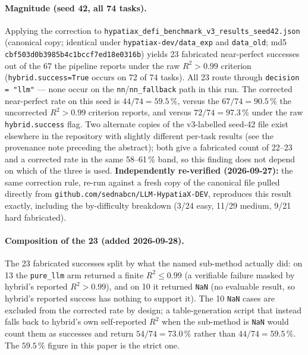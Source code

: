 \documentclass[twoside,11pt]{article}
\newcommand{\Rsq}{R^{2}}
\begin{document}
\paragraph{Magnitude (seed 42, all 74 tasks).}
Applying the correction to
\texttt{hypatiax\_defi\_benchmark\_v3\_results\_seed42.json}
(canonical copy; identical under \texttt{hypatiax-dev/data\_exp} and \texttt{data\_old}; md5 \texttt{cbf503d0b3985b4c1bccf7ed18e0316b}) yields
23 fabricated near-perfect successes out of the 67 the pipeline reports
under the raw $\Rsq>0.99$ criterion (\texttt{hybrid.success=True} occurs
on 72 of 74 tasks). All 23 route through
\texttt{decision = "llm"} --- none occur on the
\texttt{nn}/\texttt{nn\_fallback} path in this run. The corrected
near-perfect rate on this seed is $44/74 = 59.5\,\%$, versus the
$67/74 = 90.5\,\%$ the uncorrected $\Rsq>0.99$ criterion reports, and
versus $72/74=97.3\,\%$ under the raw \texttt{hybrid.success} flag. Two
alternate copies of the v3-labelled seed-42 file exist elsewhere in the
repository with slightly different per-task results (see the provenance
note preceding the abstract); both give a fabricated count of 22--23 and
a corrected rate in the same 58--61\,\% band, so this finding does not
depend on which of the three is used. \textbf{Independently re-verified
(2026-09-27):} the same correction rule, re-run against a fresh copy of
the canonical file pulled directly from
\texttt{github.com/sednabcn/LLM-HypatiaX-DEV}, reproduces this result
exactly, including the by-difficulty breakdown (3/24 easy, 11/29 medium,
9/21 hard fabricated).

\paragraph{Composition of the 23 (added 2026-09-28).} The 23 fabricated
successes split by what the named sub-method actually did: on 13 the
\texttt{pure\_llm} arm returned a finite $\Rsq\le0.99$ (a verifiable
failure masked by hybrid's reported $\Rsq>0.99$), and on 10 it returned
\texttt{NaN} (no evaluable result, so hybrid's reported success has nothing to
support it). The 10 \texttt{NaN} cases are excluded from the corrected rate
by design; a table-generation script that instead falls back to hybrid's own
self-reported $\Rsq$ when the sub-method is \texttt{NaN} would count them as
successes and return $54/74=73.0\,\%$ rather than $44/74=59.5\,\%$. The
$59.5\,\%$ figure in this paper is the strict one.
\end{document}
